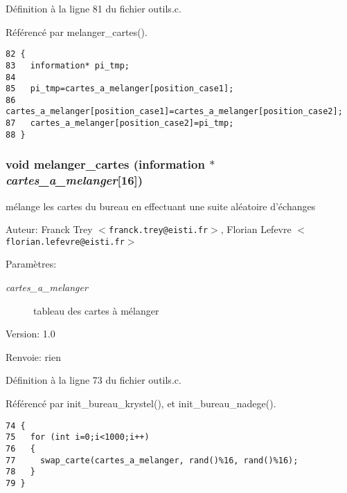 D\'{e}finition \`{a} la ligne 81 du fichier outils.c.

R\'{e}f\'{e}renc\'{e} par melanger\_\-cartes().

\begin{Code}\begin{verbatim}82 {
83   information* pi_tmp;
84   
85   pi_tmp=cartes_a_melanger[position_case1];
86   cartes_a_melanger[position_case1]=cartes_a_melanger[position_case2];
87   cartes_a_melanger[position_case2]=pi_tmp;
88 }
\end{verbatim}\end{Code}


\subsubsection{\setlength{\rightskip}{0pt plus 5cm}void melanger\_\-cartes ({\bf information} $\ast$ {\em cartes\_\-a\_\-melanger}[16])}\label{outils_8h_034d05be61f25003576b3ac8c5a2edb7}


m\'{e}lange les cartes du bureau en effectuant une suite al\'{e}atoire d'\'{e}changes 

\begin{Desc}
\item[Auteur:]Franck Trey $<${\tt franck.trey@eisti.fr}$>$, Florian Lefevre $<${\tt florian.lefevre@eisti.fr}$>$\end{Desc}
\begin{Desc}
\item[Param\`{e}tres:]
\begin{description}
\item[{\em cartes\_\-a\_\-melanger}]tableau des cartes \`{a} m\'{e}langer\end{description}
\end{Desc}
\begin{Desc}
\item[Version:]1.0 \end{Desc}
\begin{Desc}
\item[Renvoie:]rien \end{Desc}


D\'{e}finition \`{a} la ligne 73 du fichier outils.c.

R\'{e}f\'{e}renc\'{e} par init\_\-bureau\_\-krystel(), et init\_\-bureau\_\-nadege().

\begin{Code}\begin{verbatim}74 {
75   for (int i=0;i<1000;i++)
76   {
77     swap_carte(cartes_a_melanger, rand()%16, rand()%16);
78   }
79 }
\end{verbatim}\end{Code}


